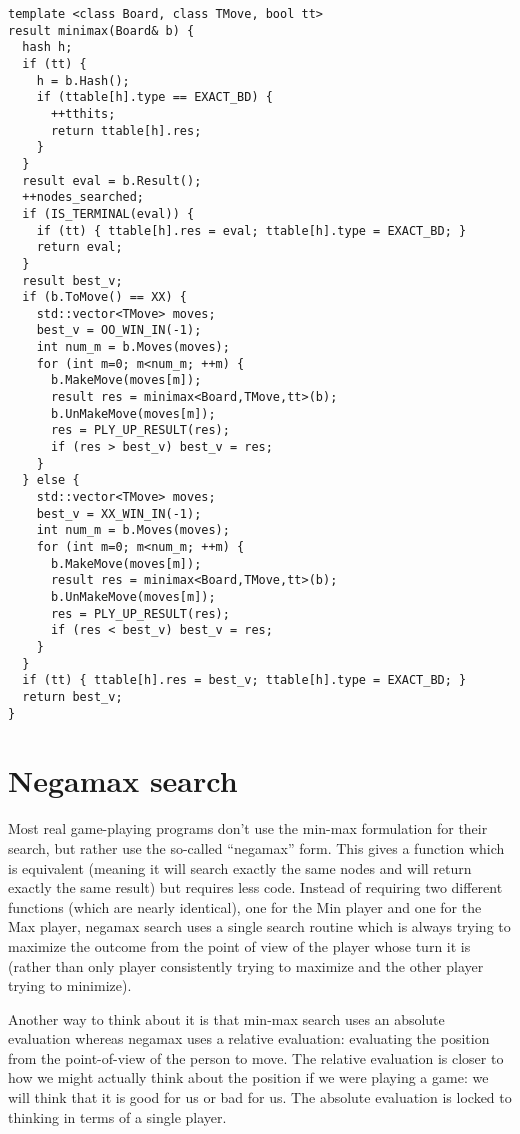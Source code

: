 \documentclass[10pt,dvipdfmx]{report}
\begin{document}
\begin{verbatim}
template <class Board, class TMove, bool tt>
result minimax(Board& b) {
  hash h;
  if (tt) {
    h = b.Hash();
    if (ttable[h].type == EXACT_BD) {
      ++tthits;
      return ttable[h].res;
    }
  }
  result eval = b.Result();
  ++nodes_searched;
  if (IS_TERMINAL(eval)) {
    if (tt) { ttable[h].res = eval; ttable[h].type = EXACT_BD; }
    return eval;
  }
  result best_v;
  if (b.ToMove() == XX) {
    std::vector<TMove> moves;
    best_v = OO_WIN_IN(-1);
    int num_m = b.Moves(moves);
    for (int m=0; m<num_m; ++m) {
      b.MakeMove(moves[m]);
      result res = minimax<Board,TMove,tt>(b);
      b.UnMakeMove(moves[m]);
      res = PLY_UP_RESULT(res);
      if (res > best_v) best_v = res;
    }
  } else {
    std::vector<TMove> moves;
    best_v = XX_WIN_IN(-1);
    int num_m = b.Moves(moves);
    for (int m=0; m<num_m; ++m) {
      b.MakeMove(moves[m]);
      result res = minimax<Board,TMove,tt>(b);
      b.UnMakeMove(moves[m]);
      res = PLY_UP_RESULT(res);
      if (res < best_v) best_v = res;
    }
  }
  if (tt) { ttable[h].res = best_v; ttable[h].type = EXACT_BD; }
  return best_v;
}
\end{verbatim}

\section{Negamax search}

Most real game-playing programs don't use the min-max
formulation for their search, but rather use the so-called
``negamax'' form.  This gives a function which is equivalent
(meaning it will search exactly the same nodes and will
return exactly the same result) but requires less code.
Instead of requiring two different functions (which are nearly identical),
one for the Min player and one for the Max player, negamax search uses
a single search routine which is always trying to maximize the outcome from the
point of view of the player whose turn it is (rather than only player consistently
trying to maximize and the other player trying to minimize).

Another way to think about it is that min-max search uses an absolute
evaluation whereas negamax uses a relative evaluation: evaluating the position
from the point-of-view of the person to move.  The relative evaluation is closer
to how we might actually think about the position if we were playing a game: we
will think that it is good for us or bad for us.  The absolute evaluation is locked
to thinking in terms of a single player.
\end{document}
